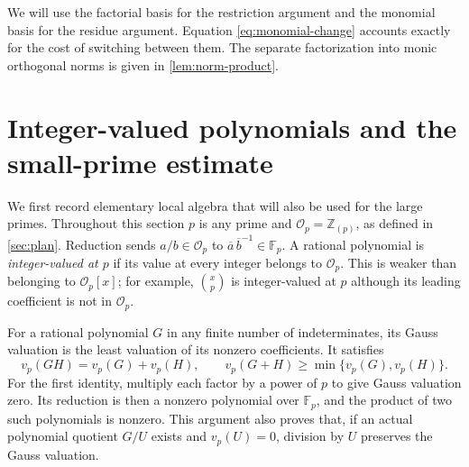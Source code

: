 \documentclass[11pt,letterpaper]{article}
\theoremstyle{definition}
\newcommand{\Z}{\mathbb Z}
\newcommand{\Fp}{\mathbb F_p}
\begin{document}
We will use the factorial basis for the restriction argument and the
monomial basis for the residue argument. Equation
\eqref{eq:monomial-change} accounts exactly for the cost of switching
between them. The separate factorization into monic orthogonal norms
is given in \cref{lem:norm-product}.


\section{Integer-valued polynomials and the small-prime estimate}\label{sec:integer-valued}

We first record elementary local algebra that will also be used for the
large primes. Throughout this section $p$ is any prime and
$\mathcal O_p=\Z_{(p)}$, as defined in \cref{sec:plan}. Reduction sends
$a/b\in\mathcal O_p$ to $\overline a\,\overline b^{-1}\in\Fp$.
A rational polynomial is \emph{integer-valued at $p$} if its value at
every integer belongs to $\mathcal O_p$. This is weaker than belonging
to $\mathcal O_p[x]$; for example, $\binom{x}{p}$ is integer-valued at
$p$ although its leading coefficient is not in $\mathcal O_p$.

For a rational polynomial $G$ in any finite number of indeterminates,
its Gauss valuation is the least valuation of its nonzero coefficients.
It satisfies
\begin{equation}\label{eq:gauss-laws}
 v_p(GH)=v_p(G)+v_p(H),\qquad
 v_p(G+H)\ge\min\{v_p(G),v_p(H)\}.
\end{equation}
For the first identity, multiply each factor by a power of $p$ to give
Gauss valuation zero. Its reduction is then a nonzero polynomial over
$\Fp$, and the product of two such polynomials is nonzero. This argument
also proves that, if an actual polynomial quotient $G/U$ exists and
$v_p(U)=0$, division by $U$ preserves the Gauss valuation.
\end{document}
